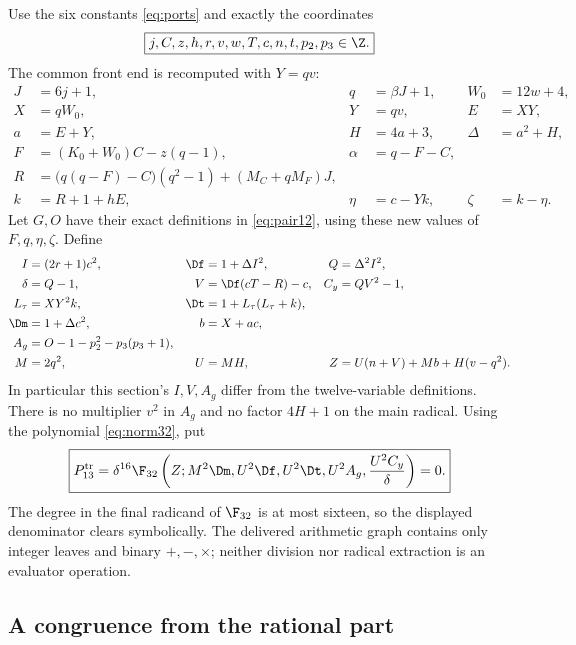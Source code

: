 Use the six constants \eqref{eq:ports} and exactly the coordinates
\begin{equation}
 \boxed{j,C,z,h,r,v,w,T,c,n,t,p_2,p_3\in\Z.}
 \label{eq:trace13variables}
\end{equation}
The common front end is recomputed with $Y=qv$:
\begin{align}
 J&=6j+1,&q&=\beta J+1,&W_0&=12w+4,\nonumber\\
 X&=qW_0,&Y&=qv,&E&=XY,\nonumber\\
 a&=E+Y,&H&=4a+3,&\Delta&=a^2+H,\nonumber\\
 F&=(K_0+W_0)C-z(q-1),&\alpha&=q-F-C,\nonumber\\
 R&=\bigl(q(q-F)-C\bigr)(q^2-1)+(M_C+qM_F)J,\nonumber\\
 k&=R+1+hE,&\eta&=c-Yk,&\zeta&=k-\eta.
 \label{eq:trace13front}
\end{align}
Let $G,O$ have their exact definitions in \eqref{eq:pair12}, using these
new values of $F,q,\eta,\zeta$. Define
\begin{align}
 I&=(2r+1)c^2,&\Df&=1+\Delta I^2,&Q&=\Delta^2I^2,\nonumber\\
 \delta&=Q-1,&V&=\Df(cT-R)-c,&C_y&=QV^2-1,\nonumber\\
 L_\tau&=XY^2k,&\Dt&=1+L_\tau(L_\tau+k),\nonumber\\
 \Dm&=1+\Delta c^2,&b&=X+ac,\nonumber\\
 A_g&=O-1-p_2^2-p_3(p_3+1),\nonumber\\
 M&=2q^2,&U&=MH,&
 Z&=U(n+V)+Mb+H(v-q^2).
 \label{eq:trace13registers}
\end{align}
In particular this section's $I,V,A_g$ differ from the twelve-variable
definitions. There is no multiplier $v^2$ in $A_g$ and no factor
$4H+1$ on the main radical. Using the polynomial \eqref{eq:norm32}, put
\begin{equation}
 \boxed{P_{13}^{\rm tr}=
 \delta^{16}\F_{32}\left(
 Z;M^2\Dm,U^2\Df,U^2\Dt,U^2A_g,\frac{U^2C_y}{\delta}
 \right)=0.}
 \label{eq:trace13poly}
\end{equation}
The degree in the final radicand of $\F_{32}$ is at most sixteen, so
the displayed denominator clears symbolically. The delivered arithmetic
graph contains only integer leaves and binary $+,-,\times$; neither
division nor radical extraction is an evaluator operation.

\subsection{A congruence from the rational part}

